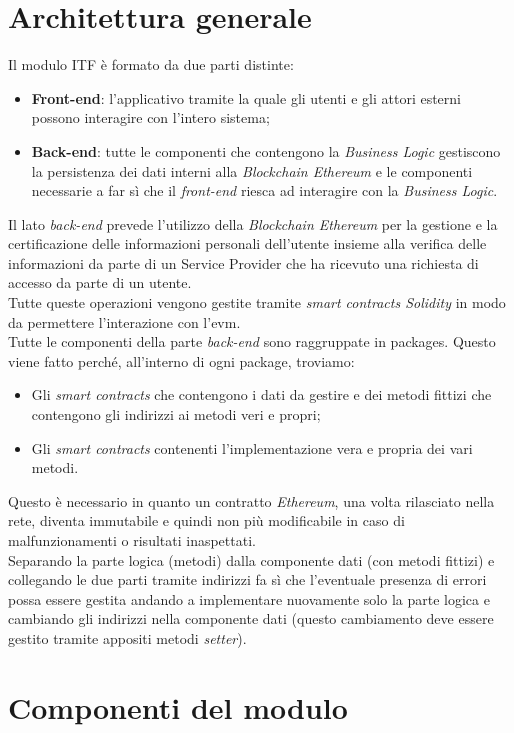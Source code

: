 \section{Architettura generale}
Il modulo \gls{ITF} è formato da due parti distinte:
\begin{itemize}
	\item \textbf{Front-end}: l'applicativo tramite la quale gli utenti e gli attori esterni possono interagire con l'intero sistema;
	\item \textbf{Back-end}: tutte le componenti che contengono la \textit{Business Logic} gestiscono la persistenza dei dati interni alla \textit{Blockchain Ethereum} e le componenti necessarie a far sì che il \textit{front-end} riesca ad interagire con la \textit{Business Logic}.
\end{itemize}
Il lato \textit{back-end} prevede l'utilizzo della \textit{Blockchain Ethereum} per la gestione e la certificazione delle informazioni personali dell'utente insieme alla verifica delle informazioni da parte di un Service Provider che ha ricevuto una richiesta di accesso da parte di un utente.\\
Tutte queste operazioni vengono gestite tramite \textit{smart contracts Solidity} in modo da permettere l'interazione con l'\gls{evm}.\\
Tutte le componenti della parte \textit{back-end} sono raggruppate in packages. Questo viene fatto perché, all'interno di ogni package, troviamo:
\begin{itemize}
	\item Gli \textit{smart contracts} che contengono i dati da gestire e dei metodi fittizi che contengono gli indirizzi ai metodi veri e propri;
	\item Gli \textit{smart contracts} contenenti l'implementazione vera e propria dei vari metodi.
\end{itemize}
Questo è necessario in quanto un contratto \textit{Ethereum}, una volta rilasciato nella rete, diventa immutabile e quindi non più modificabile in caso di malfunzionamenti o risultati inaspettati.\\
Separando la parte logica (metodi) dalla componente dati (con metodi fittizi) e collegando le due parti tramite indirizzi fa sì che l'eventuale presenza di errori possa essere gestita andando a implementare nuovamente solo la parte logica e cambiando gli indirizzi nella componente dati (questo cambiamento deve essere gestito tramite appositi metodi \textit{setter}).
\newpage
\section{Componenti del modulo}
